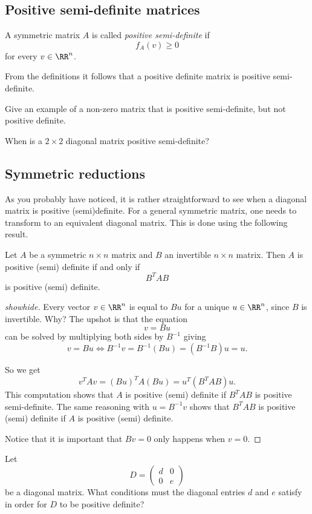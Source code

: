 \documentclass{article}
\begin{document}
\subsection{Positive semi-definite matrices}

A symmetric matrix $A$ is called \emph{positive semi-definite} if
$$
f_A(v) \geq 0
$$
for every $v\in \RR^n$.

From the definitions it follows that a positive definite matrix is
positive semi-definite.

\beginshex
Give an example of a non-zero matrix that is positive semi-definite,
but not positive definite.

When is a $2\times 2$ diagonal matrix positive semi-definite?
\endshex


\subsection{Symmetric reductions}

As you probably have noticed, it is rather straightforward to
see when a diagonal matrix is positive (semi)definite. For a
general symmetric matrix, one needs to transform to
an equivalent diagonal matrix. This is done
using the following result.

\begin{proposition}
  Let $A$ be a symmetric $n\times n$ matrix and $B$ an
  invertible $n\times n$ matrix. Then $A$ is
  positive (semi) definite if and only if
  $$
  B^T A B
  $$
  is positive (semi) definite.
\end{proposition}
  \begin{proof}[showhide]
    Every vector $v\in \RR^n$ is equal to $B u$ for a unique $u\in \RR^n$,
    since $B$ is invertible. Why? The upshot is that the equation
$$
v = B u
$$
can be solved by multiplying both sides by $B^{-1}$ giving
$$
v = B u \iff B^{-1} v = B^{-1} (B u) = (B^{-1} B) u = u.
$$



    So we get
    $$
    v^T A v = (B u)^T A (B u) = u^T (B^T A B) u.
    $$
    This computation shows that $A$ is positive (semi) definite if
    $B^T A B$ is positive semi-definite. The same
    reasoning with $u = B^{-1} v$ shows that $B^T A B$ is
    positive (semi) definite if $A$ is positive (semi) definite.

    Notice that it is important that $B v = 0$ only happens
    when $v=0$.
  \end{proof}


\beginshex
Let
$$
D =
\begin{pmatrix}
  d & 0\\
  0 & e
\end{pmatrix}
$$
be a diagonal matrix. What conditions must the diagonal
entries $d$ and $e$ satisfy in order for
$D$ to be positive definite?
\end{document}
